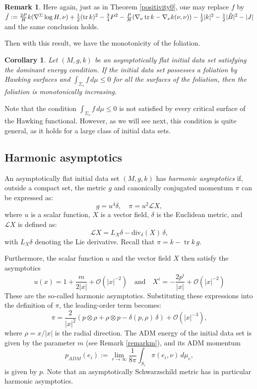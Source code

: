\documentclass[12pt,a4paper]{amsart}
\theoremstyle{plain}
\newtheorem{corollary}[theorem]{Corollary}
\theoremstyle{definition}
\newtheorem{remark}[theorem]{Remark}
\newcommand{\tr}{\operatorname{tr}}
\begin{document}
\begin{remark}
    Here again, just as in Theorem \ref{positivity0}, one may replace $f$ by 
    $ \Tilde{f}:= \frac{2P}{H}  k(\nabla^\Sigma \log H, \nu)+ \frac{1}{2 }(\tr k)^2    - \frac{3}{4} P^2- \frac{P}{H}( \nabla_\nu \tr k - \nabla_\nu k(\nu,\nu )) -  \frac{1}{2} |k|^2  -\frac{1}{2} |\mathring{B}|^2 -|J|$ and the same conclusion holds.
\end{remark}
Then with this result, we have the monotonicity of the foliation.
\begin{corollary}
    Let $(M,g,k)$ be an asymptotically flat  initial data set satisfying the dominant energy condition. If the initial data set possesses a foliation by  Hawking surfaces and   $\int_{\Sigma_{s}} f \, d\mu \leq 0$ for all the surfaces of the foliation, then the foliation is monotonically increasing.
\end{corollary}
Note that  the condition $\int_{\Sigma_{s}} f \, d\mu \leq 0$ is not satisfied by every critical surface of the Hawking functional. However, as we will see next, this condition is quite general, as it holds for a large class of initial data sets.


\subsection*{Harmonic asymptotics}

An asymptotically flat initial data set \((M, g, k)\) has \emph{harmonic asymptotics} if, outside a compact set, the metric \( g \) and canonically conjugated momentum \( \pi \) can be expressed as:
\begin{equation}\label{metricharm}
g = u^4 \delta, \quad \pi = u^2 \mathcal{L} X,
\end{equation}
where \( u \) is a scalar function, \( X \) is a vector field, \( \delta \) is the Euclidean metric, and \( \mathcal{L} X \) is defined as:
\[
\mathcal{L} X = L_X \delta - \text{div}_\delta(X) \,\delta,
\]
with \( L_X \delta \) denoting the Lie derivative. Recall that \( \pi = k - \tr k \, g \). 

 Furthermore, the scalar function $u$ and the vector field $X$ then satisfy the asymptotics 
\begin{equation}\label{harmoasym}
    u(x) = 1 + \frac{m}{2|x|} + \mathcal{O} (|x|^{-2}) \quad \text{and} \quad X^i = -\frac{2p^i}{|x|} + \mathcal{O} (|x|^{-2})
\end{equation}
These are the so-called harmonic asymptotics. Substituting these expressions into the definition of \( \pi \), the leading-order term becomes:
\begin{equation}\label{momencor}
\pi = \frac{2}{|x|^2} \left( p \otimes \rho + \rho \otimes p - \delta( p, \rho) \,\delta \right) + \mathcal{O}(|x|^{-3}),
\end{equation}
where  $\rho = x/|x|$ is the radial direction. The ADM energy of the initial data set is given by the parameter $m$ (see Remark \ref{remarkm}), and its ADM momentum
\[
p_{ADM}(e_i) := \lim_{r \to \infty} \frac{1}{8\pi} \int_{S_r} \pi (e_i, \nu) \, d\mu_e,
\]
is given by $p$. Note that an asymptotically Schwarzschild metric has in particular harmonic asymptotics. 
\end{document}
